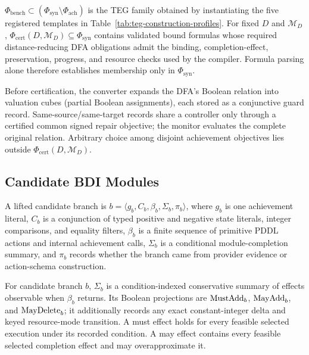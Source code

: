 \begin{definition}
$\Phi_{\mathrm{bench}}\subset
(\Phi_{\mathrm{syn}}\setminus\Phi_{\mathrm{ach}})$ is the TEG family obtained by
instantiating the five registered templates in
Table~\ref{tab:teg-construction-profiles}. For fixed $D$ and $\mathcal M_D$,
$\Phi_{\mathrm{cert}}(D,\mathcal M_D)\subseteq\Phi_{\mathrm{syn}}$ contains
validated bound formulas whose required distance-reducing DFA obligations admit
the binding, completion-effect, preservation, progress, and resource
checks used by the compiler. Formula parsing alone therefore establishes
membership only in $\Phi_{\mathrm{syn}}$.

Before certification, the converter expands the DFA's Boolean relation into
valuation cubes (partial Boolean assignments), each stored as a conjunctive guard
record. Same-source/same-target records share a controller only through a
certified common signed repair objective; the monitor evaluates the complete
original relation. Arbitrary choice among disjoint achievement objectives lies
outside $\Phi_{\mathrm{cert}}(D,\mathcal M_D)$.
\end{definition}

\subsection{Candidate BDI Modules}

\begin{definition}
A lifted candidate branch is
$b=\langle g_b,C_b,\beta_b,\Sigma_b,\pi_b\rangle$, where $g_b$ is one
achievement literal, $C_b$ is a conjunction of typed positive and negative
state literals, integer comparisons, and equality filters, $\beta_b$ is a
finite sequence of primitive PDDL actions and internal achievement calls,
$\Sigma_b$ is a conditional module-completion summary, and $\pi_b$ records
whether the branch came from provider evidence or action-schema construction.
\end{definition}

\begin{definition}
For candidate branch $b$, $\Sigma_b$ is a condition-indexed conservative
summary of effects observable when $\beta_b$ returns. Its Boolean projections
are $\mathrm{MustAdd}_b$, $\mathrm{MayAdd}_b$, and $\mathrm{MayDelete}_b$; it additionally records any
exact constant-integer delta and keyed resource-mode transition. A must effect
holds for every feasible selected execution under its recorded condition. A may
effect contains every feasible selected completion effect and may overapproximate
it.
\end{definition}

